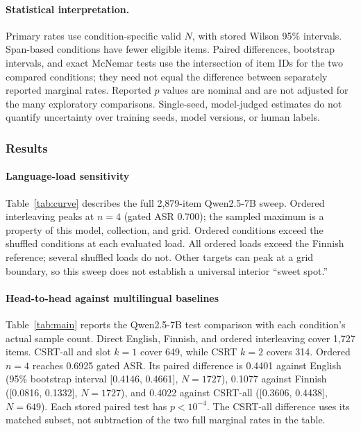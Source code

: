 \documentclass{article}
\begin{document}
\paragraph{Statistical interpretation.} Primary rates use condition-specific valid
$N$, with stored Wilson 95\% intervals. Span-based conditions have fewer eligible
items. Paired differences, bootstrap intervals, and exact McNemar tests use the
intersection of item IDs for the two compared conditions; they need not equal the
difference between separately reported marginal rates. Reported $p$ values are
nominal and are not adjusted for the many exploratory comparisons. Single-seed,
model-judged estimates do not quantify uncertainty over training seeds, model
versions, or human labels.

\subsubsection{Results}
\label{sec:results}

\paragraph{Language-load sensitivity}
Table~\ref{tab:curve} describes the full 2,879-item Qwen2.5-7B sweep. Ordered
interleaving peaks at $n=4$ (gated ASR 0.700); the sampled maximum is a property of
this model, collection, and grid. Ordered conditions exceed the shuffled conditions
at each evaluated load. All ordered loads exceed the Finnish reference; several
shuffled loads do not. Other targets can peak at a grid boundary, so this sweep
does not establish a universal interior ``sweet spot.''

\paragraph{Head-to-head against multilingual baselines}
Table~\ref{tab:main} reports the Qwen2.5-7B test comparison with each condition's
actual sample count. Direct English, Finnish, and ordered interleaving cover 1,727
items. CSRT-all and slot $k=1$ cover 649, while CSRT $k=2$ covers 314. Ordered $n=4$
reaches 0.6925 gated ASR. Its paired difference is 0.4401 against English
(95\% bootstrap interval [0.4146, 0.4661], $N=1727$), 0.1077 against Finnish
([0.0816, 0.1332], $N=1727$), and 0.4022 against CSRT-all
([0.3606, 0.4438], $N=649$). Each stored paired test has $p<10^{-4}$.
The CSRT-all difference uses its matched subset, not subtraction of the two full
marginal rates in the table.
\end{document}
